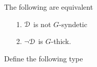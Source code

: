\begin{fact}\label{fact_fip}
  The following are equivalent
  \begin{itemize}
    \item[1.] $\EuScript D$ is not $G$-syndetic
    \item[2.] $\neg\EuScript D$ is $G$-thick.
  \end{itemize}\smallskip
\end{fact}







Define the following type



